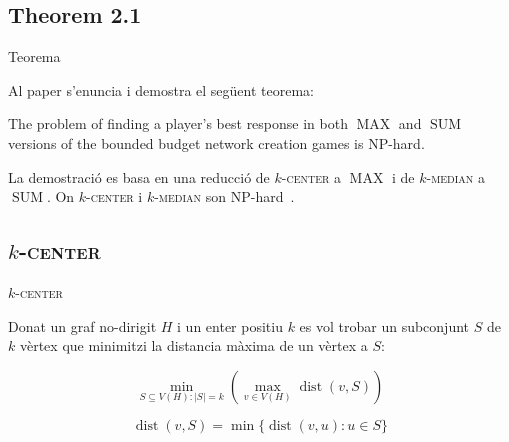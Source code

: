 \documentclass[aspectratio=169]{beamer}
\DeclareMathOperator{\dist}{dist}
\DeclareMathOperator{\SUM}{SUM}
\DeclareMathOperator{\MAX}{MAX}
\newcommand{\kcenter}{\texorpdfstring{$k$}{k}-\textsc{center}\xspace}
\newcommand{\kmedian}{\texorpdfstring{$k$}{k}-\textsc{median}\xspace}
\begin{document}
\subsection{Theorem 2.1}
\begin{frame}{Teorema}

    Al paper s'enuncia i demostra el següent teorema:
    
    \begin{theorem}
    The problem of finding a player's best response in both $\MAX$ and $\SUM$ versions of the bounded
    budget network creation games is NP-hard.
    \end{theorem}
    
    \vspace{2em}
    
    La demostració es basa en una reducció de \kcenter a $\MAX$ i de \kmedian a $\SUM$.
    On \kcenter i \kmedian son NP-hard~\cite{hsu_easy_1979,lin_e-approximations_1992}.
    
\end{frame}

\subsection{\kcenter}
\begin{frame}{\kcenter}

\begin{problem}[\kcenter]
Donat un graf no-dirigit $H$ i un enter positiu $k$ es vol trobar un subconjunt $S$ de $k$
vèrtex que minimitzi la distancia màxima de un vèrtex a $S$:

\begin{equation}
\min_{S \subseteq V(H):|S|=k} \left( \max_{v \in V(H)} \dist(v, S) \right)
\end{equation}
\end{problem}

\begin{equation}
    \dist(v, S) = \min \{ \dist(v, u) : u \in S \}
\end{equation}

\end{frame}
\end{document}
